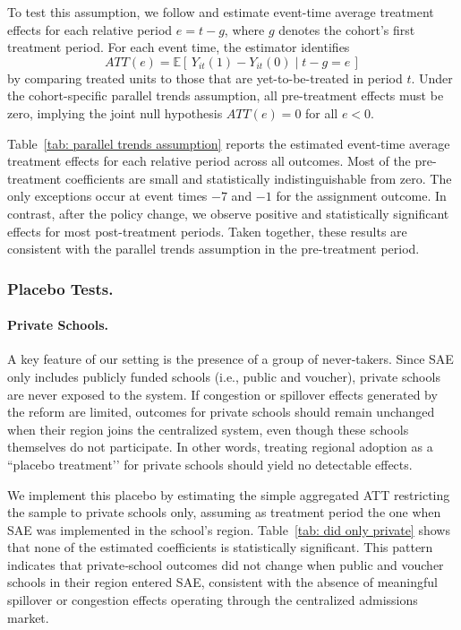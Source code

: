 \documentclass[11pt]{article}
\begin{document}
To test this assumption, we follow \cite{callaway2021} and estimate event-time average treatment effects for each relative period $e = t-g$, where $g$ denotes the cohort's first treatment period. For each event time, the estimator identifies
\[
ATT(e) = \mathbb{E}\!\left[\,Y_{it}(1) - Y_{it}(0)\mid t-g = e\,\right]
\]
by comparing treated units to those that are yet-to-be-treated in period $t$. Under the cohort-specific parallel trends assumption, all pre-treatment effects must be zero, implying the joint null hypothesis $ATT(e) = 0$ for all $e < 0$. 

Table~\ref{tab: parallel trends assumption} reports the estimated event-time average treatment effects for each relative period across all outcomes. Most of the pre-treatment coefficients are small and statistically indistinguishable from zero. The only exceptions occur at event times $-7$ and $-1$ for the assignment outcome. In contrast, after the policy change, we observe positive and statistically significant effects for most post-treatment periods. Taken together, these results are consistent with the parallel trends assumption in the pre-treatment period.




\subsubsection{Placebo Tests.}

\paragraph{Private Schools.} A key feature of our setting is the presence of a group of never‑takers.  Since SAE only includes publicly funded schools (i.e., public and voucher), private schools are never exposed to the system. If congestion or spillover effects generated by the reform are limited, outcomes for private schools should remain unchanged when their region joins the centralized system, even though these schools themselves do not participate. In other words, treating regional adoption as a “placebo treatment’’ for private schools should yield no detectable effects.

We implement this placebo by estimating the simple aggregated ATT restricting the sample to private schools only, assuming as treatment period the one when SAE was implemented in the school's region. Table~\ref{tab: did only private} shows that none of the estimated coefficients is statistically significant. This pattern indicates that private‑school outcomes did not change when public and voucher schools in their region entered SAE, consistent with the absence of meaningful spillover or congestion effects operating through the centralized admissions market.
\end{document}

